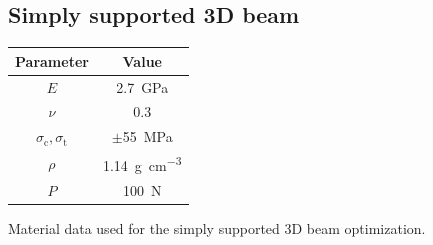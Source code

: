 \subsection{Simply supported 3D beam}
\begin{margintable}
    \small
    \centering
    \begin{tabular}{cc}
    \toprule
    \textbf{Parameter}        & \textbf{Value} \\ \midrule
    $E$              & \qty{2.7}{GPa}     \\
    $\nu$            & 0.3   \\
    $\sigma_\text{c}, \sigma_\text{t}$ & $\pm $\qty{55}{MPa} \\
    $\rho$              & \qty{1.14}{\gram\per\cubic\centi\metre}   \\
    $P$              & \qty{100}{N}   \\
    \bottomrule
    \end{tabular}
    \caption{Material data used for the simply supported 3D beam optimization.}
    \label{tab:06_3D_supp_mat}
\end{margintable}

